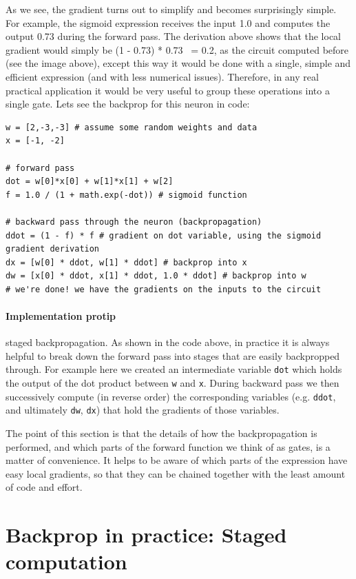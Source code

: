 As we see, the gradient turns out to simplify and becomes surprisingly simple. For example, the sigmoid expression receives the input 1.0 and computes the output 0.73 during the forward pass. The derivation above shows that the local gradient would simply be (1 - 0.73) * 0.73 ~= 0.2, as the circuit computed before (see the image above), except this way it would be done with a single, simple and efficient expression (and with less numerical issues). Therefore, in any real practical application it would be very useful to group these operations into a single gate. Lets see the backprop for this neuron in code:

\begin{lstlisting}[frame=single]
w = [2,-3,-3] # assume some random weights and data
x = [-1, -2]

# forward pass
dot = w[0]*x[0] + w[1]*x[1] + w[2]
f = 1.0 / (1 + math.exp(-dot)) # sigmoid function

# backward pass through the neuron (backpropagation)
ddot = (1 - f) * f # gradient on dot variable, using the sigmoid gradient derivation
dx = [w[0] * ddot, w[1] * ddot] # backprop into x
dw = [x[0] * ddot, x[1] * ddot, 1.0 * ddot] # backprop into w
# we're done! we have the gradients on the inputs to the circuit
\end{lstlisting}

\paragraph*{Implementation protip} staged backpropagation. As shown in the code above, in practice it is always helpful to break down the forward pass into stages that are easily backpropped through. For example here we created an intermediate variable \texttt{dot} which holds the output of the dot product between \texttt{w} and \texttt{x}. During backward pass we then successively compute (in reverse order) the corresponding variables (e.g. \texttt{ddot}, and ultimately \texttt{dw}, \texttt{dx}) that hold the gradients of those variables.

The point of this section is that the details of how the backpropagation is performed, and which parts of the forward function we think of as gates, is a matter of convenience. It helps to be aware of which parts of the expression have easy local gradients, so that they can be chained together with the least amount of code and effort.


\section*{Backprop in practice: Staged computation}

